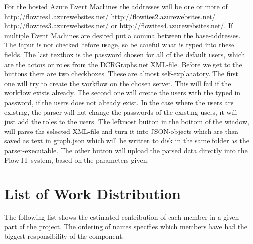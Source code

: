 For the hosted Azure Event Machines the addresses will be one or more of http://flowites1.azurewebsites.net/ http://flowites2.azurewebsites.net/ http://flowites3.azurewebsites.net/ or http://flowites4.azurewebsites.net/. If multiple Event Machines are desired put a comma between the base-addresses. The input is not checked before usage, so be careful what is typed into these fields. \newline
The last textbox is the password chosen for all of the default users, which are the actors or roles from the DCRGraphs.net XML-file. \newline
Before we get to the buttons there are two checkboxes. These are almost self-explanatory. The first one will try to create the workflow on the chosen server. This will fail if the workflow exists already. \newline
The second one will create the users with the typed in password, if the users does not already exist. In the case where the users are existing, the parser will not change the passwords of the existing users, it will just add the roles to the users. \newline
The leftmost button in the bottom of the window, will parse the selected XML-file and turn it into JSON-objects which are then saved as text in graph.json which will be written to disk in the same folder as the parser-executable. \newline
The other button will upload the parsed data directly into the Flow IT system, based on the parameters given.
\section{List of Work Distribution \label{sec:ListOfWorkDistribution}}
The following list shows the estimated contribution of each member in a given part of the project. The ordering of names specifies which members have had the biggest responsibility of the component.

